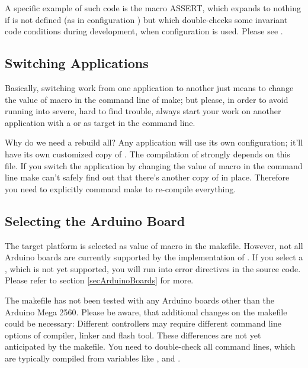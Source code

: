 A specific example of such code is the macro ASSERT, which expands to
nothing if  is not defined (as in configuration
) but which double-checks some invariant code conditions
during development, when configuration  is used. Please see
.


\subsection{Switching Applications}

Basically, switching work from one application to another just means to
change the value of macro  in the command line of make; but
please, in order to avoid running into severe, hard to find trouble, always
start your work on another application with a  or
 as target in the command line.

Why do we need a rebuild all? Any \rtos{} application will use its own
configuration; it'll have its own customized copy of
. The compilation of \rtos{} strongly depends on this
file. If you switch the application by changing the value of macro
 in the command line make can't safely find out that there's
another copy of  in place. Therefore you need to
explicitly command make to re-compile everything.


\subsection{Selecting the Arduino Board}
\label{secMakefileSelectBoard}

The target platform is selected as value of macro
 in the makefile. However, not all Arduino
boards are currently supported by the implementation of \rtos{}. If you
select a \uC, which is not yet supported, you will run into error
directives in the source code. Please refer to section
\ref{secArduinoBoards} for more.

The makefile has not been tested with any Arduino boards other than the
Arduino Mega 2560. Please be aware, that additional changes on the
makefile could be necessary: Different controllers may require different
command line options of compiler, linker and flash tool. These differences
are not yet anticipated by the makefile. You need to double-check all
command lines, which are typically compiled from variables like
,  and .

